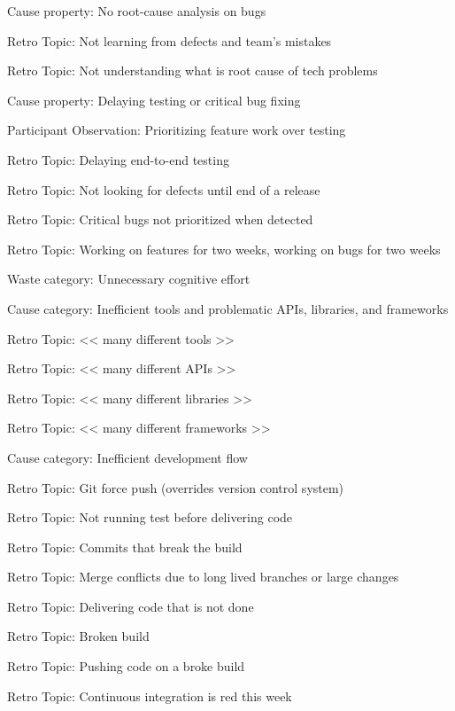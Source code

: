 \quad \quad Cause property: No root-cause analysis on bugs

\quad \quad \quad Retro Topic: Not learning from defects and team's mistakes

\quad \quad \quad Retro Topic: Not understanding what is root cause of tech problems

\quad \quad Cause property: Delaying testing or critical bug fixing

\quad \quad \quad Participant Observation: Prioritizing feature work over testing

\quad \quad \quad Retro Topic: Delaying end-to-end testing

\quad \quad \quad Retro Topic: Not looking for defects until end of a release

\quad \quad \quad Retro Topic: Critical bugs not prioritized when detected

\quad \quad \quad Retro Topic: Working on features for two weeks, working on bugs for two weeks




Waste category: Unnecessary cognitive effort

\quad Cause category: Inefficient tools and problematic APIs, libraries, and frameworks

\quad \quad Retro Topic: << many different tools >>

\quad \quad Retro Topic: << many different APIs >>

\quad \quad Retro Topic: << many different libraries >>

\quad \quad Retro Topic: << many different frameworks >>

\quad Cause category: Inefficient development flow

\quad \quad Retro Topic: Git force push (overrides version control system)

\quad \quad Retro Topic: Not running test before delivering code

\quad \quad Retro Topic: Commits that break the build

\quad \quad Retro Topic: Merge conflicts due to long lived branches or large changes

\quad \quad Retro Topic: Delivering code that is not done

\quad \quad Retro Topic: Broken build

\quad \quad Retro Topic: Pushing code on a broke build

\quad \quad Retro Topic: Continuous integration is red this week

